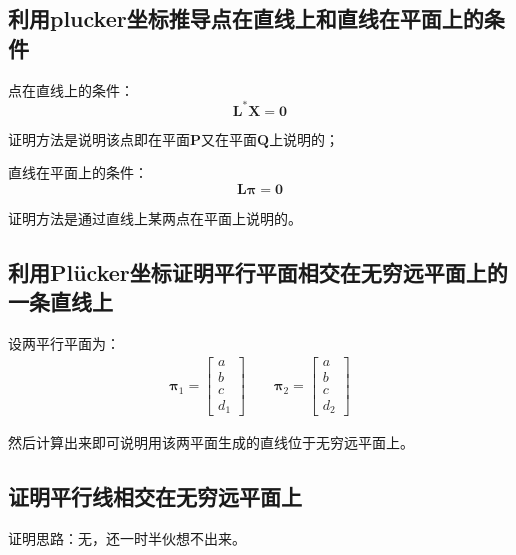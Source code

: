 \documentclass[11pt]{article}
\begin{document}
\subsection{利用plucker坐标推导点在直线上和直线在平面上的条件}
点在直线上的条件：
\begin{equation*}
  \mathbf{L^*X}=\mathbf{0}
\end{equation*}\par
证明方法是说明该点即在平面$\mathbf{P}$又在平面$\mathbf{Q}$上说明的；\par
直线在平面上的条件：
\begin{equation*}
  \mathbold{L\pi}=\mathbf{0}
\end{equation*}\par
证明方法是通过直线上某两点在平面上说明的。
\subsection{利用Plücker坐标证明平行平面相交在无穷远平面上的一条直线上}
设两平行平面为：
\begin{align*}
  \mathbold{\pi}_1=\begin{bmatrix}
                     a \\b\\c\\d_1
                   \end{bmatrix}\qquad\mathbold{\pi}_2=\begin{bmatrix}
                                                         a \\b\\c\\d_2
                                                       \end{bmatrix}
\end{align*}\par
然后计算出来即可说明用该两平面生成的直线位于无穷远平面上。
\subsection{证明平行线相交在无穷远平面上}
证明思路：无，还一时半伙想不出来。
\end{document}
